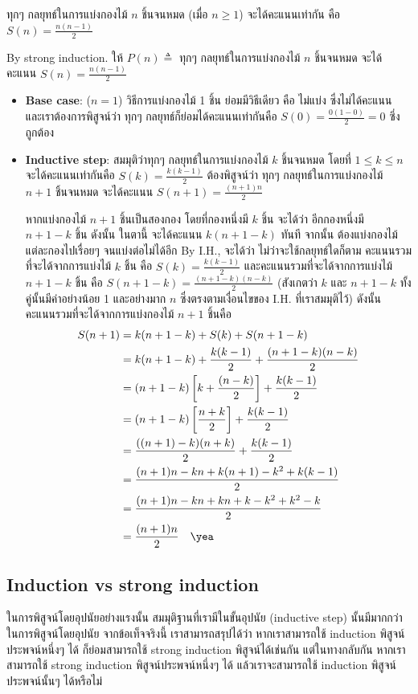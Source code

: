 \begin{theorem}
ทุกๆ กลยุทธ์ในการแบ่งกองไม้ $n$ ชิ้นจนหมด (เมื่อ $n\geq 1$) จะได้คะแนนเท่ากัน คือ $S(n)=\frac{n(n-1)}{2}$
\begin{pf}
By strong induction.  ให้ $P(n)\triangleq$ ทุกๆ กลยุทธ์ในการแบ่งกองไม้ $n$ ชิ้นจนหมด จะได้คะแนน $S(n)=\frac{n(n-1)}{2}$
\begin{itemize}
\item {\bf Base case}: ($n=1$) \quad วิธีการแบ่งกองไม้ 1 ชิ้น ย่อมมีวิธีเดียว คือ ไม่แบ่ง ซึ่งไม่ได้คะแนน และเราต้องการพิสูจน์ว่า ทุกๆ กลยุทธ์ก็ย่อมได้คะแนนเท่ากันคือ $S(0)=\frac{0(1-0)}{2}=0$ ซึ่งถูกต้อง \quad\yea
\item {\bf Inductive step}: สมมุติว่าทุกๆ กลยุทธ์ในการแบ่งกองไม้ $k$ ชิ้นจนหมด โดยที่ $1\leq k\leq n$ จะได้คะแนนเท่ากันคือ $S(k)=\frac{k(k-1)}{2}$ \enskip ต้องพิสูจน์ว่า ทุกๆ กลยุทธ์ในการแบ่งกองไม้ $n+1$ ชิ้นจนหมด จะได้คะแนน $S(n+1)=\frac{(n+1)n}{2}$

หากแบ่งกองไม้ $n+1$ ชิ้นเป็นสองกอง โดยที่กองหนึ่งมี $k$ ชิ้น จะได้ว่า อีกกองหนึ่งมี $n+1-k$ ชิ้น ดังนั้น ในตานี้ จะได้คะแนน $k(n+1-k)$ ทันที จากนั้น ต้องแบ่งกองไม้แต่ละกองไปเรื่อยๆ จนแบ่งต่อไม่ได้อีก \enskip By I.H., จะได้ว่า ไม่ว่าจะใช้กลยุทธ์ใดก็ตาม คะแนนรวมที่จะได้จากการแบ่งไม้ $k$ ชิ้น คือ $S(k)=\frac{k(k-1)}{2}$ และคะแนนรวมที่จะได้จากการแบ่งไม้ $n+1-k$ ชิ้น คือ $S(n+1-k)=\frac{(n+1-k)(n-k)}{2}$ (สังเกตว่า $k$ และ $n+1-k$ ทั้งคู่นั้นมีค่าอย่างน้อย 1 และอย่างมาก $n$ ซึ่งตรงตามเงื่อนไขของ I.H. ที่เราสมมุติไว้) ดังนั้น คะแนนรวมที่จะได้จากการแบ่งกองไม้ $n+1$ ชิ้นคือ
\begin{align*}
S(n+1)
&=k(n+1-k)+S(k)+S(n+1-k) \\
&=k(n+1-k)+\frac{k(k-1)}{2}+\frac{(n+1-k)(n-k)}{2} \\
&=(n+1-k)\left[k+\frac{(n-k)}{2}\right]+\frac{k(k-1)}{2} \\
&=(n+1-k)\left[\frac{n+k}{2}\right]+\frac{k(k-1)}{2} \\
&=\frac{((n+1)-k)(n+k)}{2}+\frac{k(k-1)}{2} \\
&=\frac{(n+1)n-kn+k(n+1)-k^2+k(k-1)}{2} \\
&=\frac{(n+1)n-kn+kn+k-k^2+k^2-k}{2} \\
&=\frac{(n+1)n}{2} \quad\textup{\yea}
\end{align*}
\end{itemize}
\end{pf}
\end{theorem}

\subsection{Induction vs strong induction}
ในการพิสูจน์โดยอุปนัยอย่างแรงนั้น สมมุติฐานที่เรามีในขั้นอุปนัย (inductive step) นั้นมีมากกว่าในการพิสูจน์โดยอุปนัย \enskip จากข้อเท็จจริงนี้ เราสามารถสรุปได้ว่า หากเราสามารถใช้ induction พิสูจน์ประพจน์หนึ่งๆ ได้ ก็ย่อมสามารถใช้ strong induction พิสูจน์ได้เช่นกัน \enskip แต่ในทางกลับกัน หากเราสามารถใช้ strong induction พิสูจน์ประพจน์หนึ่งๆ ได้ แล้วเราจะสามารถใช้ induction พิสูจน์ประพจน์นั้นๆ ได้หรือไม่


